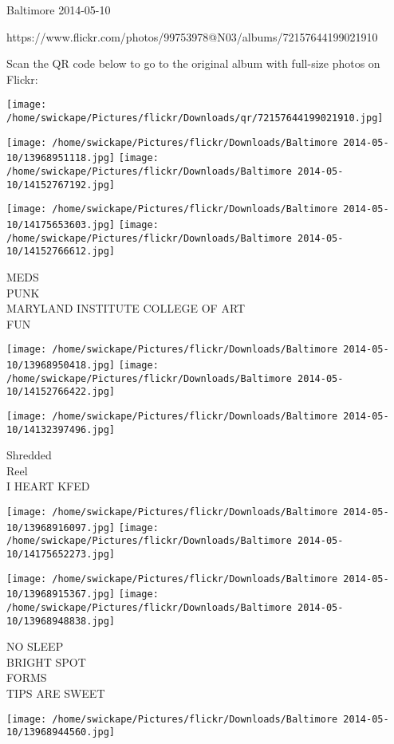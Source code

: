 \documentclass[10pt,letterpaper]{article}
\begin{document}
Baltimore 2014-05-10

https://www.flickr.com/photos/99753978@N03/albums/72157644199021910

Scan the QR code below to go to the original album with full-size photos on Flickr:

\texttt{[image: /home/swickape/Pictures/flickr/Downloads/qr/72157644199021910.jpg]}
\pagebreak

\texttt{[image: /home/swickape/Pictures/flickr/Downloads/Baltimore 2014-05-10/13968951118.jpg]}
\texttt{[image: /home/swickape/Pictures/flickr/Downloads/Baltimore 2014-05-10/14152767192.jpg]}

\texttt{[image: /home/swickape/Pictures/flickr/Downloads/Baltimore 2014-05-10/14175653603.jpg]}
\texttt{[image: /home/swickape/Pictures/flickr/Downloads/Baltimore 2014-05-10/14152766612.jpg]}

MEDS\\
PUNK\\
MARYLAND INSTITUTE COLLEGE OF ART\\
FUN
\pagebreak

\texttt{[image: /home/swickape/Pictures/flickr/Downloads/Baltimore 2014-05-10/13968950418.jpg]}
\texttt{[image: /home/swickape/Pictures/flickr/Downloads/Baltimore 2014-05-10/14152766422.jpg]}

\vspace{0.25in}
\texttt{[image: /home/swickape/Pictures/flickr/Downloads/Baltimore 2014-05-10/14132397496.jpg]}

Shredded\\
Reel\\
I HEART KFED
\pagebreak

\texttt{[image: /home/swickape/Pictures/flickr/Downloads/Baltimore 2014-05-10/13968916097.jpg]}
\texttt{[image: /home/swickape/Pictures/flickr/Downloads/Baltimore 2014-05-10/14175652273.jpg]}

\texttt{[image: /home/swickape/Pictures/flickr/Downloads/Baltimore 2014-05-10/13968915367.jpg]}
\texttt{[image: /home/swickape/Pictures/flickr/Downloads/Baltimore 2014-05-10/13968948838.jpg]}

NO SLEEP\\
BRIGHT SPOT\\
FORMS\\
TIPS ARE SWEET
\pagebreak

\texttt{[image: /home/swickape/Pictures/flickr/Downloads/Baltimore 2014-05-10/13968944560.jpg]}
\end{document}
